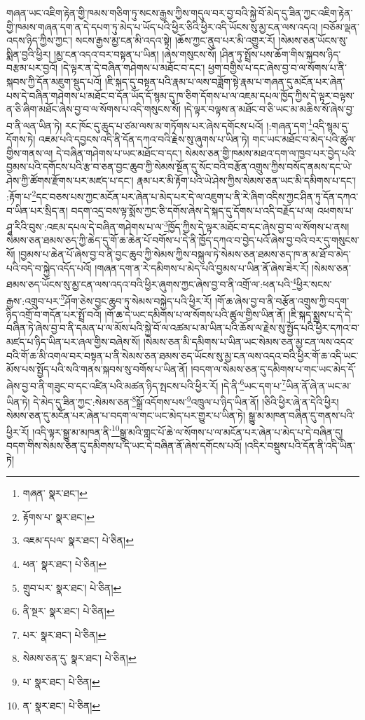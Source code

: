 གཞན་ཡང་འཇིག་རྟེན་གྱི་ཁམས་གཅིག་ཏུ་སངས་རྒྱས་ཀྱིས་གདུལ་བར་བྱ་བའི་སྐྱེ་བོ་མེད་དུ་ཟིན་ཀྱང་འཇིག་རྟེན་གྱི་ཁམས་གཞན་དག་ན་དེ་དཔག་ཏུ་མེད་པ་ཡོད་པའི་ཕྱིར་ཅིའི་ཕྱིར་འདི་ཡོངས་སུ་མྱ་ངན་ལས་འདའ། །བཅོམ་ལྡན་འདས་ཉིད་ཀྱིས་ཀྱང་། སངས་རྒྱས་མྱ་ངན་མི་འདའ་སྟེ། །ཆོས་ཀྱང་ནུབ་པར་མི་འགྱུར་རོ། །སེམས་ཅན་ཡོངས་སུ་སྨིན་བྱའི་ཕྱིར། །མྱ་ངན་འདའ་བར་བསྟན་པ་ཡིན། །ཞེས་གསུངས་སོ། །ཤིན་ཏུ་སྤྲོས་པས་ཆོག་གིས་སྐབས་ཉིད་བརྩམ་པར་བྱའོ། །དེ་ལྟར་ན་དེ་བཞིན་གཤེགས་པ་མཐོང་བ་དང་། ཕྱག་བགྱིས་པ་དང་ཞེས་བྱ་བ་ལ་སོགས་པ་ནི་སྐབས་ཀྱི་དོན་མཇུག་སྡུད་པའོ། །ཇི་སྐད་དུ་བསྟན་པའི་རྣམ་པ་ལས་བཟློག་སྟེ་རྣམ་པ་གཞན་དུ་མངོན་པར་ཞེན་པས་དེ་བཞིན་གཤེགས་པ་མཐོང་བ་དོན་ཡོད་དོ་སྙམ་དུ་ཁ་ཅིག་དོགས་པ་ལ་འཇམ་དཔལ་ཁྱོད་ཀྱིས་དེ་ལྟར་བལྟས་ན་ཅི་ཞིག་མཐོང་ཞེས་བྱ་བ་ལ་སོགས་པ་འདི་གསུངས་སོ། །དེ་ལྟར་བལྟས་ན་མཐོང་བ་ཅི་ཡང་མ་མཆིས་སོ་ཞེས་བྱ་བ་ནི་ལན་ཡིན་ཏེ། རང་ཁོང་དུ་ཆུད་པ་ཙམ་ལས་མ་གཏོགས་པར་ཞེས་དགོངས་པའོ། །:གཞན་དག་\footnote{གཞན་  སྣར་ཐང་། }འདི་སྙམ་དུ་དོགས་ཏེ། འཇམ་པའི་དབྱངས་འདི་ནི་དོན་དཀའ་བའི་རྗེས་སུ་ཞུགས་པ་ཡིན་ཏེ། གང་ཡང་མཐོང་བ་མེད་པའི་ཚུལ་གྱིས་གནས་ལ། དེ་བཞིན་གཤེགས་པ་ཡང་མཐོང་བ་དང་། སེམས་ཅན་གྱི་ཁམས་མཐའ་དག་ལ་ཁྱབ་པར་བྱེད་པའི་བྱམས་པའི་དགོངས་པའི་རྩ་བ་ཅན་བྱང་ཆུབ་ཀྱི་སེམས་སྔོན་དུ་སོང་བའི་བརྩོན་འགྲུས་ཀྱིས་བསོད་ནམས་དང་ཡེ་ཤེས་ཀྱི་ཚོགས་རྫོགས་པར་མཛད་པ་དང་། རྣམ་པར་མི་རྟོག་པའི་ཡེ་ཤེས་ཀྱིས་སེམས་ཅན་ཡང་མི་དམིགས་པ་དང་། :རྟོག་པ་\footnote{རྟོགས་པ་  སྣར་ཐང་། }དང་བཅས་པས་ཀྱང་མངོན་པར་ཞེན་པ་མེད་པར་དེ་ལ་འཇུག་པ་ནི་རེ་ཞིག་འདིས་ཀྱང་ཤིན་ཏུ་དོན་དཀའ་བ་ཡིན་པར་སྲིད་ན། བདག་འདྲ་བས་ལྟ་སྨོས་ཀྱང་ཅི་དགོས་ཞེས་དེ་སྐད་དུ་དོགས་པ་འདི་བརྗོད་པ་ལ། འཕགས་པ་ཤཱ་རིའི་བུས་:འཇམ་དཔལ་དེ་བཞིན་གཤེགས་པ་ལ་\footnote{འཇམ་དཔལ་  སྣར་ཐང་།  པེ་ཅིན། }ཁྱོད་ཀྱིས་དེ་ལྟར་མཐོང་བ་དང་ཞེས་བྱ་བ་ལ་སོགས་པ་ནས། སེམས་ཅན་ཐམས་ཅད་ཀྱི་ཆེད་དུ་གོ་ཆ་ཆེན་པོ་བགོས་པ་དེ་ནི་ཁྱོད་དཀའ་བ་བྱེད་པའོ་ཞེས་བྱ་བའི་བར་དུ་གསུངས་སོ། །བྱམས་པ་ཆེན་པོ་ཞེས་བྱ་བ་ནི་བྱང་ཆུབ་ཀྱི་སེམས་ཀྱིས་བསྐུལ་ཏེ་སེམས་ཅན་ཐམས་ཅད་ཁ་ན་མ་ཐོ་བ་མེད་པའི་བདེ་བ་སྐྱེད་འདོད་པའོ། །གཞན་དག་ན་རེ་དམིགས་པ་མེད་པའི་བྱམས་པ་ཡིན་ནོ་ཞེས་ཟེར་རོ། །སེམས་ཅན་ཐམས་ཅད་ཡོངས་སུ་མྱ་ངན་ལས་འདའ་བའི་ཕྱིར་ཞུགས་ཀྱང་ཞེས་བྱ་བ་ནི་འགྲོ་ལ་:ཕན་པའི་\footnote{ཕན་  སྣར་ཐང་།  པེ་ཅིན། }ཕྱིར་སངས་རྒྱས་:འགྲུབ་པར་\footnote{གྲུབ་པར་  སྣར་ཐང་།  པེ་ཅིན། }ཤོག་ཅེས་བྱང་ཆུབ་ཏུ་སེམས་བསྐྱེད་པའི་ཕྱིར་རོ། །གོ་ཆ་ཞེས་བྱ་བ་ནི་བརྩོན་འགྲུས་ཀྱི་བདག་ཉིད་འགྲོ་བ་གདོན་པར་སྤྲོ་བའོ། །གོ་ཆ་དེ་ཡང་དམིགས་པ་ལ་སོགས་པའི་ཚུལ་གྱིས་ཡིན་ནོ། །ཇི་སྐད་སྨྲས་པ་དེ་དེ་བཞིན་ཏེ་ཞེས་བྱ་བ་ནི་དམན་པ་ལ་མོས་པའི་སྐྱེ་བོ་ལ་འཚམ་པ་མ་ཡིན་པའི་ཆོས་ལ་རྗེས་སུ་སྤྱོད་པའི་ཕྱིར་དཀའ་བ་མཛད་པ་ཉིད་ཡིན་པར་ཞལ་གྱིས་བཞེས་སོ། །སེམས་ཅན་མི་དམིགས་པ་ཡིན་ཡང་སེམས་ཅན་མྱ་ངན་ལས་འདའ་བའི་གོ་ཆ་མི་འགལ་བར་བསྟན་པ་ནི་སེམས་ཅན་ཐམས་ཅད་ཡོངས་སུ་མྱ་ངན་ལས་འདའ་བའི་ཕྱིར་གོ་ཆ་འདི་ཡང་མོས་པས་སྤྱོད་པའི་སའི་གནས་སྐབས་སུ་བགོས་པ་ཡིན་ནོ། །བདག་ལ་སེམས་ཅན་དུ་དམིགས་པ་གང་ཡང་མེད་དོ་ཞེས་བྱ་བ་ནི་གཟུང་བ་དང་འཛིན་པའི་མཚན་ཉིད་སྤངས་པའི་ཕྱིར་རོ། །དེ་ནི་\footnote{ནི་སྔར་  སྣར་ཐང་།  པེ་ཅིན། }ཡང་དག་པ་\footnote{པར་  སྣར་ཐང་།  པེ་ཅིན། }ཡིན་ནོ་ཞེ་ན་ཡང་མ་ཡིན་ཏེ། དེ་མེད་དུ་ཟིན་ཀྱང་:སེམས་ཅན་\footnote{སེམས་ཅན་དུ་  སྣར་ཐང་།  པེ་ཅིན། }སྒྲོ་འདོགས་པས་\footnote{པ་  སྣར་ཐང་།  པེ་ཅིན། }འཁྲུལ་པ་ཉིད་ཡིན་ནོ། །ཅིའི་ཕྱིར་ཞེ་ན་དེའི་ཕྱིར། སེམས་ཅན་དུ་མངོན་པར་ཞེན་པ་བདག་ལ་གང་ཡང་མེད་པར་གྱུར་པ་ཡིན་ཏེ། སྒྱུ་མ་མཁན་བཞིན་དུ་གནས་པའི་ཕྱིར་རོ། །འདི་ལྟར་སྒྱུ་མ་མཁན་ནི་\footnote{ན་  སྣར་ཐང་།  པེ་ཅིན། }སྒྱུ་མའི་གླང་པོ་ཆེ་ལ་སོགས་པ་ལ་མངོན་པར་ཞེན་པ་མེད་པ་དེ་བཞིན་དུ། བདག་གིས་སེམས་ཅན་དུ་དམིགས་པ་དེ་ཡང་དེ་བཞིན་ནོ་ཞེས་དགོངས་པའོ། །འདིར་བསྡུས་པའི་དོན་ནི་འདི་ཡིན་ཏེ། 